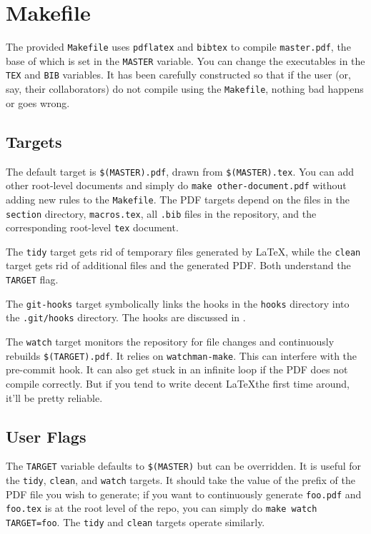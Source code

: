 \section{Makefile}\label{sec:make}

The provided \texttt{Makefile} uses \texttt{pdflatex} and \texttt{bibtex} to compile \texttt{master.pdf}, the base of which is set in the \texttt{MASTER} variable.
You can change the executables in the \texttt{TEX} and \texttt{BIB} variables.  It has been carefully constructed so that if the user (or, say, their collaborators) do not compile using the \texttt{Makefile}, nothing bad happens or goes wrong.

\subsection{Targets}

The default target is \texttt{\$(MASTER).pdf}, drawn from \texttt{\$(MASTER).tex}.
You can add other root-level documents and simply do \texttt{make other-document.pdf} without adding new rules to the \texttt{Makefile}.
The PDF targets depend on the files in the \texttt{section} directory, \texttt{macros.tex}, all \texttt{.bib} files in the repository, and the corresponding root-level \texttt{tex} document.

The \texttt{tidy} target gets rid of temporary files generated by \LaTeX, while the \texttt{clean} target gets rid of additional files and the generated PDF.  Both understand the \texttt{TARGET} flag.

The \texttt{git-hooks} target symbolically links the hooks in the \texttt{hooks} directory into the \texttt{.git/hooks} directory.  The hooks are discussed in .

The \texttt{watch} target monitors the repository for file changes and continuously rebuilds \texttt{\$(TARGET).pdf}.  It relies on \texttt{watchman-make}\cite{watchman}.
This can interfere with the pre-commit \git hook.
It can also get stuck in an infinite loop if the PDF does not compile correctly.
But if you tend to write decent \LaTeX the first time around, it'll be pretty reliable.


\subsection{User Flags}

The \texttt{TARGET} variable defaults to \texttt{\$(MASTER)} but can be overridden.  It is useful for the \texttt{tidy}, \texttt{clean}, and \texttt{watch} targets.
It should take the value of the prefix of the PDF file you wish to generate; if you want to continuously generate \texttt{foo.pdf} and \texttt{foo.tex} is at the root level of the repo, you can simply do \texttt{make watch TARGET=foo}.
The \texttt{tidy} and \texttt{clean} targets operate similarly.

